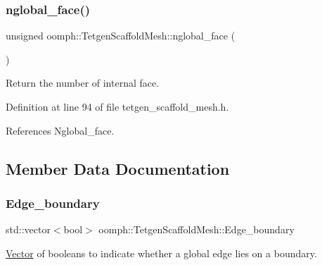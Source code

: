 \mbox{\label{classoomph_1_1TetgenScaffoldMesh_af393ab19a84c1ac3e9799553cbd8b21b}} 
\subsubsection{\texorpdfstring{nglobal\+\_\+face()}{nglobal\_face()}}
{\footnotesize\ttfamily unsigned oomph\+::\+Tetgen\+Scaffold\+Mesh\+::nglobal\+\_\+face (\begin{DoxyParamCaption}{ }\end{DoxyParamCaption})\hspace{0.3cm}{\ttfamily [inline]}}



Return the number of internal face. 



Definition at line 94 of file tetgen\+\_\+scaffold\+\_\+mesh.\+h.



References Nglobal\+\_\+face.



\subsection{Member Data Documentation}
\mbox{\label{classoomph_1_1TetgenScaffoldMesh_a023c244b1bac044abbb0d52a25f26d89}} 
\subsubsection{\texorpdfstring{Edge\+\_\+boundary}{Edge\_boundary}}
{\footnotesize\ttfamily std\+::vector$<$bool$>$ oomph\+::\+Tetgen\+Scaffold\+Mesh\+::\+Edge\+\_\+boundary\hspace{0.3cm}{\ttfamily [protected]}}



\hyperlink{classoomph_1_1Vector}{Vector} of booleans to indicate whether a global edge lies on a boundary. 




